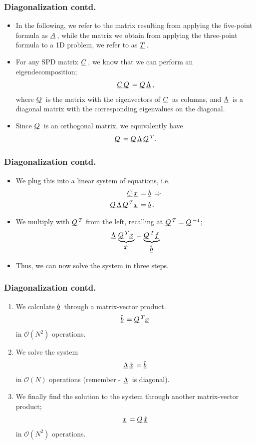 \documentclass{beamer}
\newcommand{\ub}[1]{\underbar{$#1$}\,}
\begin{document}
\begin{frame}\frametitle{Diagonalization contd.}
  \begin{itemize}
    \item In the following, we refer to the matrix resulting from applying the five-point formula
      as $\ub{A}$, while the matrix we obtain from applying the three-point formula to
      a 1D problem, we refer to as $\ub{T}$.
    \item For any SPD matrix $\ub{C}$, we know that we can perform an eigendecomposition;
      \[
        \ub{C}\ub{Q} = \ub{Q}\ub{\Lambda},
      \]
      where $\ub{Q}$ is the matrix with the eigenvectors of $\ub{C}$ as columns,
      and $\ub{\Lambda}$ is a diagonal matrix with the corresponding eigenvalues on
      the diagonal.
    \item Since $\ub{Q}$ is an orthogonal matrix, we equivalently have
      \[
        \ub{Q} = \ub{Q}\ub{\Lambda}\ub{Q}^T.
      \]
  \end{itemize}
\end{frame}
\begin{frame}\frametitle{Diagonalization contd.}
  \begin{itemize}
    \item We plug this into a linear system of equations, i.e.
      \[
        \begin{split}
          \ub{C}\ub{x} &= \ub{b} \Rightarrow \\
          \ub{Q}\ub{\Lambda}\ub{Q}^T\ub{x} &= \ub{b}.
        \end{split}
      \]
    \item We multiply with $\ub{Q}^T$ from the left,
          recalling at $\ub{Q}^T = \ub{Q}^{-1}$;
      \[
        \ub{\Lambda}\underbrace{\ub{Q}^T\ub{x}}_{\tilde{\ub{x}}} = \underbrace{\ub{Q}^T\ub{f}}_{\ub{\tilde{b}}}
      \]
    \item Thus, we can now solve the system in three steps.
  \end{itemize}
\end{frame}
\begin{frame}\frametitle{Diagonalization contd.}
  \begin{enumerate}
    \item We calculate $\ub{b}$ through a matrix-vector product.
      \[
        \ub{\tilde{b}} = \ub{Q}^T\ub{x}
      \]
      in $\mathcal{O}\left(N^2\right)$ operations.
    \item We solve the system
      \[
        \ub{\Lambda}\ub{\tilde{x}} = \ub{\tilde{b}}
      \]
      in $\mathcal{O}\left(N\right)$ operations (remember - $\ub{\Lambda}$ is diagonal).
    \item We finally find the solution to the system through another matrix-vector product;
      \[
        \ub{x} = \ub{Q}\ub{\tilde{x}}
      \]
      in $\mathcal{O}\left(N^2\right)$ operations.
  \end{enumerate}
\end{frame}
\end{document}
